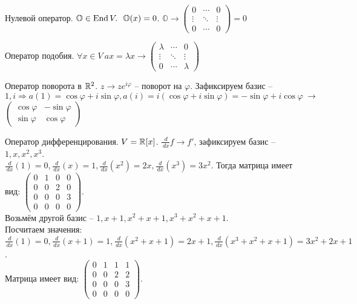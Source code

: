 \begin{Example}
	\begin{MyList}
		\item Нулевой оператор. $\mathbb{O} \in \End V. \ \ \mathbb{O}(x) = 0$. $\mathbb{O} \to 
			\left(\begin{array}{cccc}
			0 & \cdots & 0 \\ 
			\vdots & \ddots & \vdots \\
			0 &  \cdots & 0
			\end{array}\right) = 0 $
		\item Оператор подобия. $\forall x \in V \ ax = \lambda x \to 
		    \left(\begin{array}{cccc}
			\lambda & \cdots & 0 \\ 
			\vdots & \ddots & \vdots \\
			0 &  \cdots & \lambda
			\end{array}\right) $
		\item Оператор поворота в $\mathbb{R}^2$. $z \to z e^{i\varphi}$ -- поворот на $\varphi$. Зафиксируем базис -- $1, i \Rightarrow a(1) = \cos \varphi + i\sin \varphi, a(i) = i(\cos \varphi + i\sin \varphi) = -\sin \varphi + i\cos \varphi  \ \to$
			$\left(\begin{array}{cccc}
				\cos \varphi & -\sin \varphi \\ 
				\sin \varphi & \cos \varphi
				\end{array}\right) $
		\item Оператор дифференцирования. $V = \mathbb{R}[x]$. $\frac{\,d}{\,dx} f \to f'$, зафиксируем базис -- $1, x, x^2, x^3$. \\ 
		$\frac{\,d}{\,dx}(1) = 0, \frac{\,d}{\,dx} (x) = 1, \frac{\,d}{\,dx}(x^2) = 2x, \frac{\,d}{\,dx} (x^3) = 3x^2$. Тогда матрица имеет вид: 
			$\left(\begin{array}{cccc}
			0 & 1 & 0 & 0\\ 
			0 & 0 & 2 & 0\\
			0 & 0 & 0 & 3 \\
			0 & 0 & 0 & 0
			\end{array}\right)$.\\
		Возьмём другой базис -- $1, x+1, x^2 + x + 1, x^3 + x^2 + x + 1$. \\
		Посчитаем значения: $\frac{\,d}{\,dx} (1) = 0, \frac{\,d}{\,dx}(x + 1) = 1, \frac{\,d}{\,dx}(x^2 + x + 1) = 2x + 1, \frac{\,d}{\,dx}(x^3 +x^2 + x + 1) = 3x^2 + 2x + 1$. \\
		Матрица имеет вид: 
		$\left(\begin{array}{cccc}
			0 & 1 & 1 & 1\\ 
			0 & 0 & 2 & 2\\
			0 & 0 & 0 & 3 \\
			0 & 0 & 0 & 0
			\end{array}\right)$.
	\end{MyList}
\end{Example}

